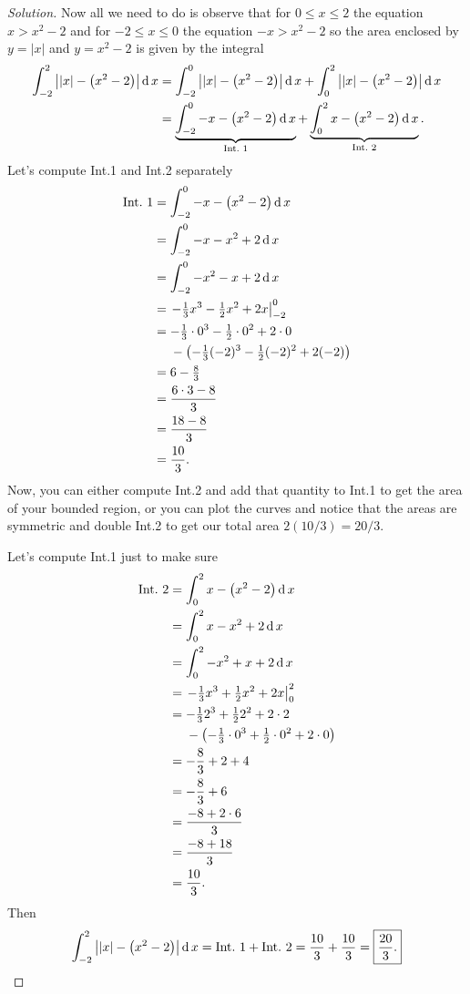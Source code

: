 \begin{proof}[Solution]
Now all we need to do is observe that for $0\leq x\leq 2$ the equation
$x>x^2-2$ and for $-2\leq x\leq 0$ the equation $-x>x^2-2$ so the area
enclosed by $y=|x|$ and $y=x^2-2$ is given by the integral
\begingroup
\allowdisplaybreaks
\begin{align*}
\int_{-2}^2\left||x|-\left(x^2-2\right)\right|\diff x
&=\int_{-2}^0\left||x|-\left(x^2-2\right)\right|\diff x
+\int_0^2\left||x|-\left(x^2-2\right)\right|\diff x\\
&=\underbrace{\int_{-2}^0-x-\left(x^2-2\right)\diff x}_{\text{Int.\@ 1}}
+\underbrace{\int_0^2x-\left(x^2-2\right)\diff x}_{\text{Int.\@ 2}}.
\end{align*}
\endgroup
Let's compute Int.\@ 1 and Int.\@ 2 separately
\begingroup
\allowdisplaybreaks
\begin{align*}
\text{Int.\@ 1}
&=\int_{-2}^0 -x-\left(x^2-2\right)\diff x\\
&=\int_{-2}^0 -x-x^2+2\diff x\\
&=\int_{-2}^0 -x^2-x+2\diff x\\
&=\left.-\tfrac{1}{3}x^3-\tfrac{1}{2}x^2+2x\right|_{-2}^0\\
&=-\tfrac{1}{3}\cdot 0^3-\tfrac{1}{2}\cdot 0^2+2\cdot 0\\
&\phantom{{}={}}-\left(-\tfrac{1}{3}(-2)^3-\tfrac{1}{2}(-2)^2+2(-2)\right)\\
&=6-\tfrac{8}{3}\\
&=\frac{6\cdot 3-8}{3}\\
&=\frac{18-8}{3}\\
&=\frac{10}{3}.
\end{align*}
\endgroup
Now, you can either compute Int.\@ 2 and add that quantity to Int.\@ 1 to
get the area of your bounded region, or you can plot the curves and notice
that the areas are symmetric and double Int.\@ 2 to get our total area
$\boxed{2(10/3)=20/3}$.

Let's compute Int.\@ 1 just to make sure
\begingroup
\allowdisplaybreaks
\begin{align*}
\text{Int.\@ 2}
&=\int_0^2 x-\left(x^2-2\right)\diff x\\
&=\int_0^2x-x^2+2\diff x\\
&=\int_0^2-x^2+x+2\diff x\\
&=\left.-\tfrac{1}{3}x^3+\tfrac{1}{2}x^2+2x\right|_0^2\\
&=-\tfrac{1}{3}2^3+\tfrac{1}{2}2^2+2\cdot 2\\
&\phantom{{}={}}-\left(-\tfrac{1}{3}\cdot 0^3+\tfrac{1}{2}\cdot 0^2+2\cdot
  0\right)\\
&=-\frac{8}{3}+2+4\\
&=-\frac{8}{3}+6\\
&=\frac{-8+2\cdot 6}{3}\\
&=\frac{-8+18}{3}\\
&=\frac{10}{3}.
\end{align*}
\endgroup
Then
\[
\int_{-2}^2\left||x|-\left(x^2-2\right)\right|\diff x=\text{Int.\@
  1}+\text{Int.\@ 2}=\frac{10}{3}+\frac{10}{3}=\boxed{\frac{20}{3}.}\qedhere
\]
\end{proof}

